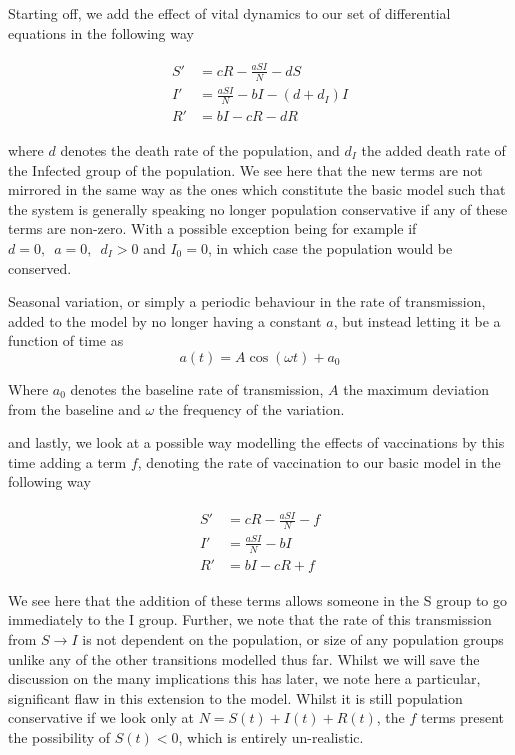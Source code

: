 \documentclass[10pt,showpacs,preprintnumbers,amsmath,amssymb,nofootinbib,aps,prl,twocolumn,groupedaddress,superscriptaddress,showkeys]{revtex4-1}
\begin{document}
      Starting off, we add the effect of vital dynamics to our set of differential equations in the following way

      \begin{align}
        \begin{split}
          S' &= cR - \frac{aSI}{N} - dS\\
          I' &= \frac{aSI}{N} - bI - (d + d_I)I \\
          R' &= bI - cR - dR
        \label{eqn:transition rates, vitdyn}
      \end{split}
    \end{align}

    where $d$ denotes the death rate of the population, and $d_I$ the added death rate of the Infected group of the population. We see here that the new terms are not mirrored in the same way as the ones which constitute the basic model such that the system is generally speaking no longer population conservative if any of these terms are non-zero. With a possible exception being for example if $d=0,\enspace a=0,\enspace d_I>0$ and $I_0 = 0$, in which case the population would be conserved.


    Seasonal variation, or simply a periodic behaviour in the rate of transmission, added to the model by no longer having a constant $a$, but instead letting it be a function of time as
    \begin{equation}
      a(t) = A\cos(\omega t) + a_0
      \label{eqn: seavar}
    \end{equation}

    Where $a_0$ denotes the baseline rate of transmission, $A$ the maximum deviation from the baseline and $\omega$ the frequency of the variation. 

    and lastly, we look at a possible way modelling the effects of vaccinations by this time adding a term $f$, denoting the rate of vaccination to our basic model in the following way

    \begin{align}
        \begin{split}
          S' &= cR - \frac{aSI}{N} - f\\
          I' &= \frac{aSI}{N} - bI\\
          R' &= bI - cR + f
        \label{eqn:transition rates, vaxx}
      \end{split}
    \end{align}

    We see here that the addition of these terms allows someone in the S group to go immediately to the I group. Further, we note that the rate of this transmission from  $S\rightarrow I$ is not dependent on the population, or size of any population groups unlike any of the other transitions modelled thus far. Whilst we will save the discussion on the many implications this has later, we note here a particular, significant flaw in this extension to the model. Whilst it is still population conservative if we look only at $N = S(t) + I(t) + R(t)$, the $f$ terms present the possibility of $S(t)<0$, which is entirely un-realistic.
\end{document}
